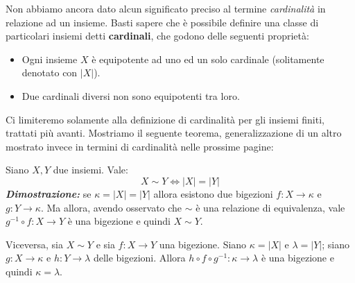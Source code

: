 \begin{osservaz}
Non abbiamo ancora dato alcun significato preciso al termine
\textit{cardinalità} in relazione ad un insieme. Basti sapere che
è possibile definire una classe di particolari insiemi detti
\textbf{cardinali}, che godono delle seguenti proprietà:
\begin{itemize}
    \item Ogni insieme $X$ è equipotente ad uno ed un solo cardinale
    (solitamente denotato con $|X|$).

    \item Due cardinali diversi non sono equipotenti tra loro.
\end{itemize}
Ci limiteremo solamente alla definizione di cardinalità per gli
insiemi finiti, trattati più avanti. Mostriamo il seguente teorema,
generalizzazione di un altro mostrato invece in termini di cardinalità
nelle prossime pagine:
\begin{tcolorbox}[title = {Equipotenza come uguaglianza tra cardinali}]
Siano $X,Y$ due insiemi. Vale:
\[ X\sim Y \Leftrightarrow |X| = |Y| \]
\textit{\textbf{Dimostrazione:}} se $\kappa = |X| = |Y|$ allora esistono
due bigezioni $f:X\to \kappa $ e $g:Y\to \kappa$. Ma allora,
avendo osservato che $\sim$ è una relazione di equivalenza,
vale $g^{-1}\circ f: X\to Y$ è una bigezione e quindi $X\sim Y$.

Viceversa, sia $X\sim Y$ e sia $f:X\to Y$ una bigezione. Siano
$\kappa = |X|$ e $\lambda = |Y|$; siano $g:X\to \kappa$ e $h:Y\to \lambda$
delle bigezioni. Allora $h\circ f\circ g^{-1}:\kappa\to\lambda$ è una bigezione
e quindi $\kappa = \lambda$.
\cvd
\end{tcolorbox}

\end{osservaz}